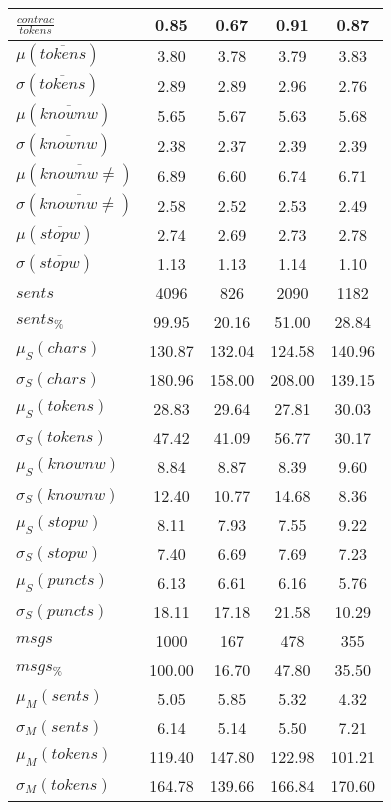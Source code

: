 \begin{table}[h!]
\begin{center}
\begin{tabular}{| l || c | c | c | c |}
$\frac{contrac}{tokens}$ & 0.85  & 0.67  & 0.91  & 0.87 \\\hline\hline
$\mu(\overline{tokens})$ & 3.80  & 3.78  & 3.79  & 3.83 \\
$\sigma(\overline{tokens})$ & 2.89  & 2.89  & 2.96  & 2.76 \\\hline
$\mu(\overline{knownw})$ & 5.65  & 5.67  & 5.63  & 5.68 \\
$\sigma(\overline{knownw})$ & 2.38  & 2.37  & 2.39  & 2.39 \\\hline
$\mu(\overline{knownw \neq})$ & 6.89  & 6.60  & 6.74  & 6.71 \\
$\sigma(\overline{knownw \neq})$ & 2.58  & 2.52  & 2.53  & 2.49 \\\hline
$\mu(\overline{stopw})$ & 2.74  & 2.69  & 2.73  & 2.78 \\
$\sigma(\overline{stopw})$ & 1.13  & 1.13  & 1.14  & 1.10 \\\hline\hline
$sents$ & 4096  & 826  & 2090  & 1182 \\
$sents_{\%}$ & 99.95  & 20.16  & 51.00  & 28.84 \\\hline
$\mu_S(chars)$ & 130.87  & 132.04  & 124.58  & 140.96 \\
$\sigma_S(chars)$ & 180.96  & 158.00  & 208.00  & 139.15 \\\hline
$\mu_S(tokens)$ & 28.83  & 29.64  & 27.81  & 30.03 \\
$\sigma_S(tokens)$ & 47.42  & 41.09  & 56.77  & 30.17 \\\hline
$\mu_S(knownw)$ & 8.84  & 8.87  & 8.39  & 9.60 \\
$\sigma_S(knownw)$ & 12.40  & 10.77  & 14.68  & 8.36 \\\hline
$\mu_S(stopw)$ & 8.11  & 7.93  & 7.55  & 9.22 \\
$\sigma_S(stopw)$ & 7.40  & 6.69  & 7.69  & 7.23 \\\hline
$\mu_S(puncts)$ & 6.13  & 6.61  & 6.16  & 5.76 \\
$\sigma_S(puncts)$ & 18.11  & 17.18  & 21.58  & 10.29 \\\hline\hline
$msgs$ & 1000  & 167  & 478  & 355 \\
$msgs_{\%}$ & 100.00  & 16.70  & 47.80  & 35.50 \\\hline
$\mu_M(sents)$ & 5.05  & 5.85  & 5.32  & 4.32 \\
$\sigma_M(sents)$ & 6.14  & 5.14  & 5.50  & 7.21 \\\hline
$\mu_M(tokens)$ & 119.40  & 147.80  & 122.98  & 101.21 \\
$\sigma_M(tokens)$ & 164.78  & 139.66  & 166.84  & 170.60 \\\hline

\end{tabular}
\end{center}
\end{table}
